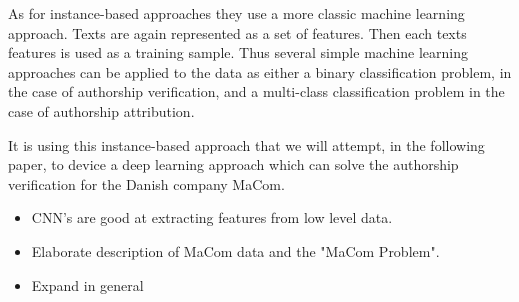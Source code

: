 As for instance-based approaches they use a more classic machine learning
approach. Texts are again represented as a set of features. Then each texts
features is used as a training sample. Thus several simple machine learning
approaches can be applied to the data as either a binary classification problem,
in the case of authorship verification, and a multi-class classification problem
in the case of authorship attribution.

It is using this instance-based approach that we will attempt, in the following
paper, to device a deep learning approach which can solve the authorship
verification for the Danish company MaCom.


\begin{itemize}
    \item CNN's are good at extracting features from low level data.
    \item Elaborate description of MaCom data and the "MaCom Problem".
    \item Expand in general
\end{itemize}
